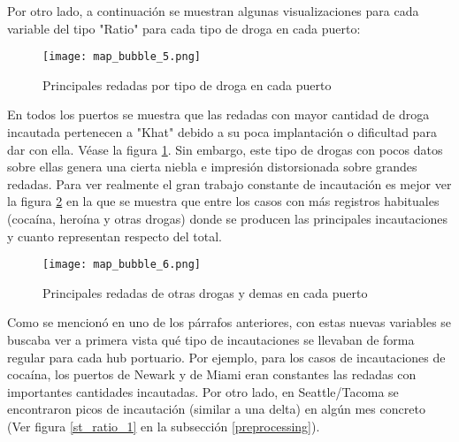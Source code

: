 \documentclass[12pt]{article}
\begin{document}
		Por otro lado, a continuación se muestran algunas visualizaciones para cada variable del tipo "Ratio" para cada tipo de droga en cada puerto:
		
		\begin{figure}[H]
			\caption{\label{map_bubble_5} Principales redadas por tipo de droga en cada puerto}
			\centering
			\hspace*{1cm}
			\texttt{[image: map\_bubble\_5.png]}
		\end{figure}
		
		En todos los puertos se muestra que las redadas con mayor cantidad de droga incautada pertenecen a "Khat" debido a su poca implantación o dificultad para dar con ella. Véase la figura \ref{map_bubble_5}. Sin embargo, este tipo de drogas con pocos datos sobre ellas genera una cierta niebla e impresión distorsionada sobre grandes redadas. Para ver realmente el gran trabajo constante de incautación es mejor ver la figura \ref{map_bubble_6} en la que se muestra que entre los casos con más registros habituales (cocaína, heroína y otras drogas) donde se producen las principales incautaciones y cuanto representan respecto del total.
		
		\begin{figure}[H]
			\caption{\label{map_bubble_6} Principales redadas de otras drogas y demas en cada puerto}
			\centering
			\hspace*{1cm}
			\texttt{[image: map\_bubble\_6.png]}
		\end{figure}
		
		Como se mencionó en uno de los párrafos anteriores, con estas nuevas variables se buscaba ver a primera vista qué tipo de incautaciones se llevaban de forma regular para cada hub portuario. Por ejemplo, para los casos de incautaciones de cocaína, los puertos de Newark y de Miami eran constantes las redadas con importantes cantidades incautadas. Por otro lado, en Seattle/Tacoma se encontraron picos de incautación (similar a una delta) en algún mes concreto (Ver figura \ref{st_ratio_1} en la subsección \ref{preprocessing}).
		
\end{document}
